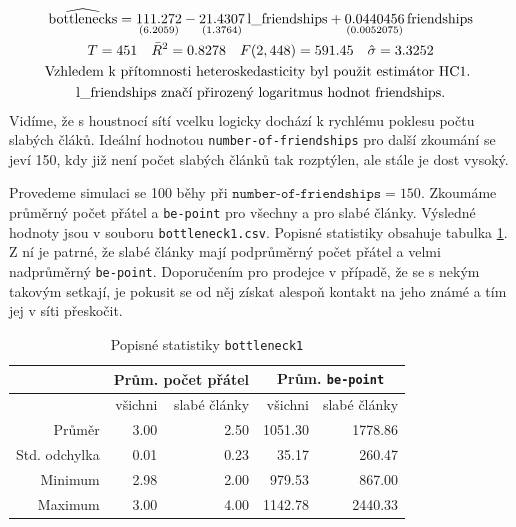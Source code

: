 \documentclass[a4wide,12pt]{report}
\begin{document}
\begin{gather}
\widehat{\rm bottlenecks} = 
\underset{(6.2059)}{111.272}
-\underset{(1.3764)}{21.4307}\,\mbox{l\_friendships}
+\underset{(0.0052075)}{0.0440456}\,\mbox{friendships}
 \notag \\
T = 451 \quad \bar{R}^2 = 0.8278 \quad F(2,448) = 591.45 \quad \hat{\sigma} = 3.3252 \notag \\
\text{Vzhledem k přítomnosti heteroskedasticity byl použit estimátor HC1. } \notag \\
\text{\mbox{l\_friendships} značí přirozený logaritmus hodnot \mbox{friendships}.} \notag
\end{gather}
Vidíme, že s houstnocí sítí vcelku logicky dochází k rychlému poklesu počtu slabých čláků. Ideální hodnotou \texttt{number-of-friendships} pro další zkoumání se jeví 150, kdy již není počet slabých článků tak rozptýlen, ale stále je dost vysoký.

Provedeme simulaci se 100 běhy při $\texttt{number-of-friendships}=150$. Zkoumáme průměrný počet přátel a \texttt{be-point} pro všechny a pro slabé články. Výsledné hodnoty jsou v souboru \texttt{bottleneck1.csv}. Popisné statistiky obsahuje tabulka \ref{tab:bottleneck1_desc}. Z ní je patrné, že slabé články mají podprůměrný počet přátel a velmi nadprůměrný \texttt{be-point}. Doporučením pro prodejce v případě, že se s nekým takovým setkají, je pokusit se od něj získat alespoň kontakt na jeho známé a tím jej v síti přeskočit.
\begin{table}[h]
  \begin{center}
  \begin{tabular}{|r|r|r|r|r|}
  \hline
   & \multicolumn{2}{|c|}{Prům. počet přátel} & \multicolumn{2}{|c|}{Prům. \texttt{be-point}} \\\hline
	  &všichni	&slabé články	&všichni	&slabé články\\\hline
  Průměr	&3.00	&2.50	&1051.30	&1778.86\\
  Std. odchylka	&0.01	&0.23	&35.17	&260.47\\
  Minimum	&2.98	&2.00	&979.53	&867.00\\
  Maximum	&3.00	&4.00	&1142.78	&2440.33\\\hline
  \end{tabular}
  \end{center}
  \caption{Popisné statistiky \texttt{bottleneck1}}
  \label{tab:bottleneck1_desc}
\end{table}
\end{document}

